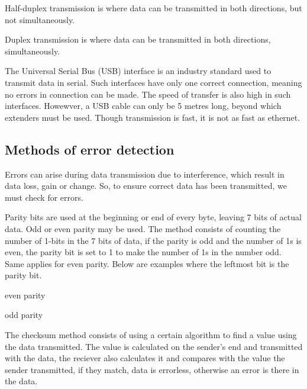 Half-duplex transmission is where data can be transmitted in both directions, but not 
simultaneously.

Duplex transmission is where data can be transmitted in both directions, simultaneously.

The Universal Serial Bus (USB) interface is an industry standard used to transmit data in serial.
Such interfaces have only one correct connection, meaning no errors in connection can be made. The
speed of transfer is also high in such interfaces. Howewver, a USB cable can only be 5 metres long,
beyond which extenders must be used. Though transmission is fast, it is not as fast as ethernet.

\subsection{Methods of error detection}

Errors can arise during data transmission due to interference, which result in data loss, gain or
change. So, to ensure correct data has been transmitted, we must check for errors.

Parity bits are used at the beginning or end of every byte, leaving 7 bits of actual data. Odd or
even parity may be used. The method consists of counting the number of 1-bits in the 7 bits of 
data, if the parity is odd and the number of 1s is even, the parity bit is set to 1 to make the
number of 1s in the number odd. Same applies for even parity. Below are examples where the leftmost
bit is the parity bit.

\vspace{.2cm}
\begin{minipage}{.5\textwidth}
\begin{flushright}
	       

	       
\end{flushright}
\end{minipage}
\begin{minipage}{.4\textwidth}
	even parity

	odd parity
\end{minipage}
\vspace{.2cm}

The checksum method consists of using a certain algorithm to find a value using the data 
transmitted. The value is calculated on the sender's end and transmitted with the data, the 
reciever also calculates it and compares with the value the sender transmitted, if they match, data
is errorless, otherwise an error is there in the data.

